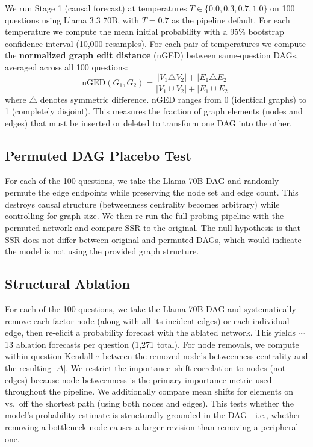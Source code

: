 \documentclass[11pt]{article}
\begin{document}
We run Stage 1 (causal forecast) at temperatures $T \in \{0.0, 0.3, 0.7, 1.0\}$ on 100 questions using Llama 3.3 70B, with $T = 0.7$ as the pipeline default. For each temperature we compute the mean initial probability with a 95\% bootstrap confidence interval (10,000 resamples). For each pair of temperatures we compute the \textbf{normalized graph edit distance} (nGED) between same-question DAGs, averaged across all 100 questions:
\begin{equation}
    \text{nGED}(G_1, G_2) = \frac{|V_1 \triangle V_2| + |E_1 \triangle E_2|}{|V_1 \cup V_2| + |E_1 \cup E_2|}
\end{equation}
where $\triangle$ denotes symmetric difference. nGED ranges from 0 (identical graphs) to 1 (completely disjoint). This measures the fraction of graph elements (nodes and edges) that must be inserted or deleted to transform one DAG into the other.

\subsection{Permuted DAG Placebo Test}

For each of the 100 questions, we take the Llama 70B DAG and randomly permute the edge endpoints while preserving the node set and edge count. This destroys causal structure (betweenness centrality becomes arbitrary) while controlling for graph size. We then re-run the full probing pipeline with the permuted network and compare SSR to the original. The null hypothesis is that SSR does not differ between original and permuted DAGs, which would indicate the model is not using the provided graph structure.

\subsection{Structural Ablation}

For each of the 100 questions, we take the Llama 70B DAG and systematically remove each factor node (along with all its incident edges) or each individual edge, then re-elicit a probability forecast with the ablated network. This yields ${\sim}$13 ablation forecasts per question (1,271 total). For node removals, we compute within-question Kendall $\tau$ between the removed node's betweenness centrality and the resulting $|\Delta|$. We restrict the importance--shift correlation to nodes (not edges) because node betweenness is the primary importance metric used throughout the pipeline. We additionally compare mean shifts for elements on vs.\ off the shortest path (using both nodes and edges). This tests whether the model's probability estimate is structurally grounded in the DAG---i.e., whether removing a bottleneck node causes a larger revision than removing a peripheral one.
\end{document}
